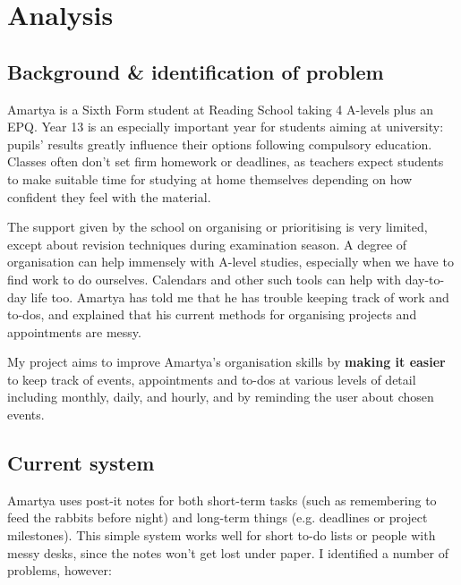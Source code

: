 \section{Analysis}

\subsection{Background \& identification of problem}

Amartya is a Sixth Form student at Reading School taking 4 A-levels plus an EPQ.
Year 13 is an especially important year for students aiming at university:
pupils' results greatly influence their options following compulsory education.
Classes often don't set firm homework or deadlines, as teachers expect students
to make suitable time for studying at home themselves depending on how confident
they feel with the material.

The support given by the school on organising or prioritising is very limited,
except about revision techniques during examination season. A degree of
organisation can help immensely with A-level studies, especially when we have to
find work to do ourselves. Calendars and other such tools can help with
day-to-day life too. Amartya has told me that he has trouble keeping track of
work and to-dos, and explained that his current methods for organising projects
and appointments are messy.

My project aims to improve Amartya's organisation skills by \textbf{making it
easier} to keep track of events, appointments and to-dos at various levels of
detail including monthly, daily, and hourly, and by reminding the user about
chosen events.


\subsection{Current system}

Amartya uses post-it notes for both short-term tasks (such as remembering to
feed the rabbits before night) and long-term things (e.g. deadlines or project
milestones). This simple system works well for short to-do lists or people with
messy desks, since the notes won't get lost under paper. I identified a number
of problems, however:

